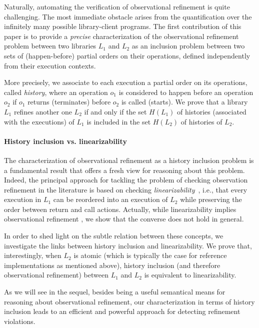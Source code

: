 Naturally, automating the verification of observational refinement is quite
challenging. The most immediate obstacle arises from the quantification over
the infinitely many possible library-client programs. The first contribution of
this paper is to provide a \emph{precise} characterization of the observational
refinement problem between two libraries $L_1$ and $L_2$ as an inclusion
problem between two sets of (happen-before) partial orders on their operations,
defined independently from their execution contexts.

More precisely, we associate to each execution a partial order on its
operations, called \emph{history}, where an operation $o_1$ is considered to
happen before an operation $o_2$ if $o_1$ returns (terminates) before $o_2$ is
called (starts). We prove that a library $L_1$ refines another one $L_2$ if and
only if the set $H(L_1)$ of histories (associated with the executions) of $L_1$
is included in the set $H(L_2)$ of histories of $L_2$.

\paragraph{History inclusion vs. linearizability}

The characterization of observational refinement as a history inclusion problem
is a fundamental result that offers a fresh view for reasoning about this
problem. Indeed, the principal approach for tackling the problem of checking
observation refinement in the literature is based on checking
\emph{linearizability}~\cite{}, i.e., that every execution in $L_1$ can be
reordered into an execution of $L_2$ while preserving the order between return
and call actions. Actually, while linearizability implies observational
refinement \cite{}, we show that the converse does not hold in general.

In order to shed light on the subtle relation between these concepts, we
investigate the links between history inclusion and linearizability. We prove
that, interestingly, when $L_2$ is atomic (which is typically the case for
reference implementations as mentioned above), history inclusion (and therefore
observational refinement) between $L_1$ and $L_2$ is equivalent to
linearizability.

As we will see in the sequel, besides being a useful semantical means for
reasoning about observational refinement, our characterization in terms of
history inclusion leads to an efficient and powerful approach for detecting
refinement violations.

